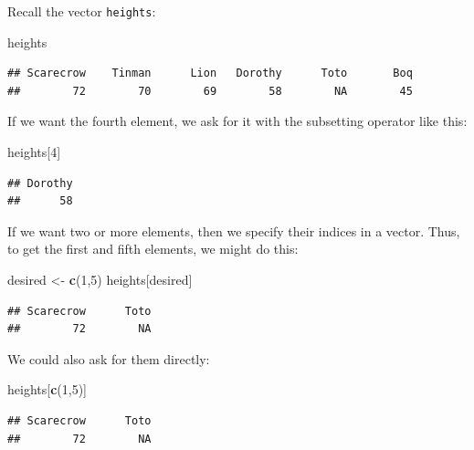 \documentclass[]{book}
\makeatletter
\newenvironment{Shaded}{\begin{snugshade}}{\end{snugshade}}
\newcommand{\KeywordTok}[1]{\textcolor[rgb]{0.13,0.29,0.53}{\textbf{{#1}}}}
\newcommand{\DecValTok}[1]{\textcolor[rgb]{0.00,0.00,0.81}{{#1}}}
\newcommand{\StringTok}[1]{\textcolor[rgb]{0.31,0.60,0.02}{{#1}}}
\newcommand{\NormalTok}[1]{{#1}}
\newenvironment{kframe}{%
\medskip{}
\setlength{\fboxsep}{.8em}
 \def\at@end@of@kframe{}%
 \ifinner\ifhmode%
  \def\at@end@of@kframe{\end{minipage}}%
  \begin{minipage}{\columnwidth}%
 \fi\fi%
 \def\FrameCommand##1{\hskip\@totalleftmargin \hskip-\fboxsep
 \colorbox{shadecolor}{##1}\hskip-\fboxsep
     \hskip-\linewidth \hskip-\@totalleftmargin \hskip\columnwidth}%
 \MakeFramed {\advance\hsize-\width
   \@totalleftmargin\z@ \linewidth\hsize
   \@setminipage}}%
 {\par\unskip\endMakeFramed%
 \at@end@of@kframe}
\renewenvironment{Shaded}{\begin{kframe}}{\end{kframe}}
\theoremstyle{definition}
\theoremstyle{definition}
\theoremstyle{remark}
\makeatother
\begin{document}
Recall the vector \texttt{heights}:

\begin{Shaded}
\begin{Highlighting}[]
\NormalTok{heights}
\end{Highlighting}
\end{Shaded}

\begin{verbatim}
## Scarecrow    Tinman      Lion   Dorothy      Toto       Boq 
##        72        70        69        58        NA        45
\end{verbatim}

If we want the fourth element, we ask for it with the subsetting
operator like this:

\begin{Shaded}
\begin{Highlighting}[]
\NormalTok{heights[}\DecValTok{4}\NormalTok{]}
\end{Highlighting}
\end{Shaded}

\begin{verbatim}
## Dorothy 
##      58
\end{verbatim}

If we want two or more elements, then we specify their indices in a
vector. Thus, to get the first and fifth elements, we might do this:

\begin{Shaded}
\begin{Highlighting}[]
\NormalTok{desired <-}\StringTok{ }\KeywordTok{c}\NormalTok{(}\DecValTok{1}\NormalTok{,}\DecValTok{5}\NormalTok{)}
\NormalTok{heights[desired]}
\end{Highlighting}
\end{Shaded}

\begin{verbatim}
## Scarecrow      Toto 
##        72        NA
\end{verbatim}

We could also ask for them directly:

\begin{Shaded}
\begin{Highlighting}[]
\NormalTok{heights[}\KeywordTok{c}\NormalTok{(}\DecValTok{1}\NormalTok{,}\DecValTok{5}\NormalTok{)]}
\end{Highlighting}
\end{Shaded}

\begin{verbatim}
## Scarecrow      Toto 
##        72        NA
\end{verbatim}
\end{document}
